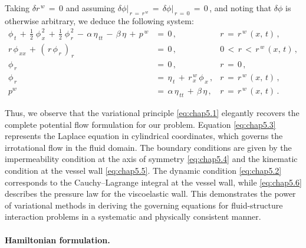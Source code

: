 \documentclass[alpha-refs, 12pt]{wiley-article}
\begin{document}
Taking $\delta r^{\,w}\,=\,0$ and assuming $\delta \phi\big|_{\,r\,=\,r^{\,w}}\,=\,\delta \phi\big|_{\,r\,=\,0}\,=\,0\,$, and noting that $\delta \phi$ is otherwise arbitrary, we deduce the following system:
\begin{align}
  \phi_{\,t}\,+\,\frac{1}{2}\;\phi_{\,x}^{\,2}\,+\,\frac{1}{2}\;\phi_{\,r}^{\,2}\,-\,\alpha\,\eta_{\,tt}\,-\,\beta\,\eta\,+\,p^{\,w} &=\,0 \,, & r\,=\,r^{\,w}\,(x,\,t)\,, \label{eq:chap5.2}\\[0.5em]
  r\,\phi_{\,xx}\,+\,(\,r\,\phi_{\,r}\,)_{\,r} &=\,0 \,, & 0\,<\,r\,<\,r^{\,w}\,(x,\,t)\,, \label{eq:chap5.3}\\[0.5em]
  \phi_{\,r} &=\,0\,, & r\,=\,0\,, \label{eq:chap5.4}\\[0.5em]
  \phi_{\,r} &=\,\eta_{\,t}\,+\,r^{\,w}_{\,x}\,\phi_{\,x}\,, & r\,=\,r^{\,w}\,(x,\,t)\,, \label{eq:chap5.5}\\[0.5em]
  p^{w} &=\,\alpha\,\eta_{\,tt}\,+\,\beta\,\eta\,, & r\,=\,r^{\,w}\,(x,\,t)\,. \label{eq:chap5.6}
\end{align}

Thus, we observe that the variational principle \eqref{eq:chap5.1} elegantly recovers the complete potential flow formulation for our problem. Equation \eqref{eq:chap5.3} represents the Laplace equation in cylindrical coordinates, which governs the irrotational flow in the fluid domain. The boundary conditions are given by the impermeability condition at the axis of symmetry \eqref{eq:chap5.4} and the kinematic condition at the vessel wall \eqref{eq:chap5.5}. The dynamic condition \eqref{eq:chap5.2} corresponds to the Cauchy--Lagrange integral at the vessel wall, while \eqref{eq:chap5.6} describes the pressure law for the viscoelastic wall. This demonstrates the power of variational methods in deriving the governing equations for fluid-structure interaction problems in a systematic and physically consistent manner.

\paragraph{Hamiltonian formulation.}
\end{document}
